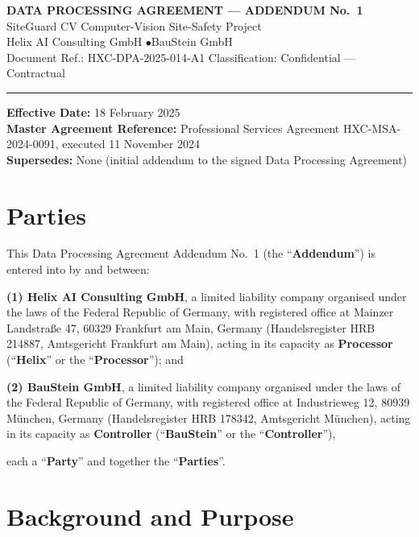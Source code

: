 \documentclass[11pt]{article}
\begin{document}
\begin{center}
{\Large\bfseries DATA PROCESSING AGREEMENT --- ADDENDUM No.\ 1}\\[4pt]
{\large SiteGuard CV Computer-Vision Site-Safety Project}\\[6pt]
{\normalsize Helix AI Consulting GmbH \quad$\bullet$\quad BauStein GmbH}\\[4pt]
{\small Document Ref.: HXC-DPA-2025-014-A1 \quad Classification: Confidential --- Contractual}
\end{center}

\vspace{0.5em}
\hrule
\vspace{1em}

\textbf{Effective Date:} 18 February 2025\\
\textbf{Master Agreement Reference:} Professional Services Agreement HXC-MSA-2024-0091, executed 11 November 2024\\
\textbf{Supersedes:} None (initial addendum to the signed Data Processing Agreement)

\section{Parties}

This Data Processing Agreement Addendum No.\ 1 (the ``\textbf{Addendum}'') is entered into by and between:

\textbf{(1) Helix AI Consulting GmbH}, a limited liability company organised under the laws of the Federal Republic of Germany, with registered office at Mainzer Landstra\ss e 47, 60329 Frankfurt am Main, Germany (Handelsregister HRB 214887, Amtsgericht Frankfurt am Main), acting in its capacity as \textbf{Processor} (``\textbf{Helix}'' or the ``\textbf{Processor}''); and

\textbf{(2) BauStein GmbH}, a limited liability company organised under the laws of the Federal Republic of Germany, with registered office at Industrieweg 12, 80939 M\"unchen, Germany (Handelsregister HRB 178342, Amtsgericht M\"unchen), acting in its capacity as \textbf{Controller} (``\textbf{BauStein}'' or the ``\textbf{Controller}''),

each a ``\textbf{Party}'' and together the ``\textbf{Parties}''.

\section{Background and Purpose}
\end{document}
